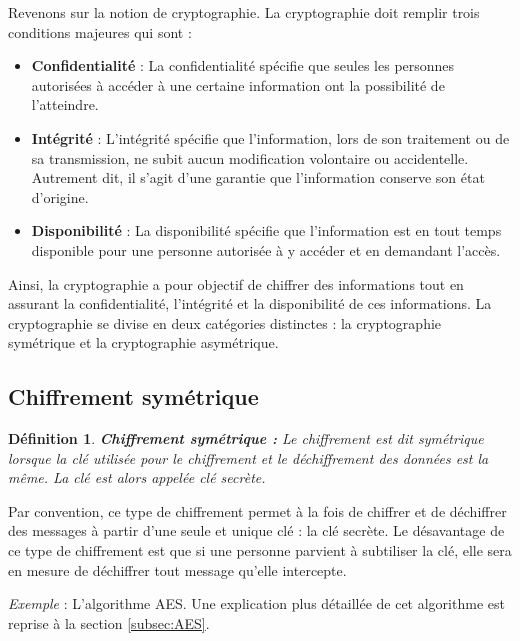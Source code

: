 \documentclass[oneside]{book}
\newtheorem{definition}{Définition}[section]
\begin{document}
\hspace{-0.5cm}Revenons sur la notion de cryptographie. La cryptographie doit remplir trois conditions majeures qui sont :
\begin{itemize}
\item \textbf{Confidentialité} : La confidentialité spécifie que seules les personnes autorisées à accéder à une certaine information ont la possibilité de l'atteindre.
\item \textbf{Intégrité} : L'intégrité spécifie que l'information, lors de son traitement ou de sa transmission, ne subit aucun modification volontaire ou accidentelle. Autrement dit, il s'agit d'une garantie que l'information conserve son état d'origine.
\item \textbf{Disponibilité} : La disponibilité spécifie que l'information est en tout temps disponible pour une personne autorisée à y accéder et en demandant l'accès. \\
\end{itemize}

Ainsi, la cryptographie a pour objectif de chiffrer des informations tout en assurant la confidentialité, l'intégrité et la disponibilité de ces informations. La cryptographie se divise en deux catégories distinctes : la cryptographie symétrique et la cryptographie asymétrique. 

\subsection{Chiffrement symétrique}
\label{subsec:Chiffrement_symétrique}

\theoremstyle{definition}
\begin{definition}{\textbf{Chiffrement symétrique :}}
Le chiffrement est dit symétrique lorsque la clé utilisée pour le chiffrement et le déchiffrement des données est la même. La clé est alors appelée \textit{clé secrète}. 
\end{definition}

\hspace{-0.5cm}Par convention, ce type de chiffrement permet à la fois de chiffrer et de déchiffrer des messages à partir d'une seule et unique clé : la clé secrète. Le désavantage de ce type de chiffrement est que si une personne parvient à subtiliser la clé, elle sera en mesure de déchiffrer tout message qu'elle intercepte. 

\hspace{-0.5cm}\textit{Exemple} : L'algorithme AES. Une explication plus détaillée de cet algorithme est reprise à la section \ref{subsec:AES}.
\end{document}
